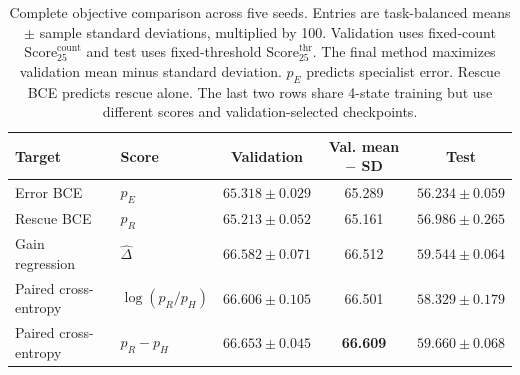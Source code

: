 \begin{table}[H]
\centering
\caption{Complete objective comparison across five seeds. Entries are task-balanced means $\pm$ sample standard deviations, multiplied by 100. Validation uses fixed-count $\mathrm{Score}_{25}^{\mathrm{count}}$ and test uses fixed-threshold $\mathrm{Score}_{25}^{\mathrm{thr}}$. The final method maximizes validation mean minus standard deviation. $p_E$ predicts specialist error. Rescue BCE predicts rescue alone. The last two rows share 4-state training but use different scores and validation-selected checkpoints.}
\label{tab:objective_full}
\small
\setlength{\tabcolsep}{6pt}
\begin{tabular}{@{}llccc@{}}
\toprule
Target & Score & Validation & Val. mean $-$ SD & Test \\
\midrule
Error BCE & $p_E$ & $65.318\pm0.029$ & 65.289 & $56.234\pm0.059$ \\
Rescue BCE & $p_R$ & $65.213\pm0.052$ & 65.161 & $56.986\pm0.265$ \\
Gain regression & $\widehat\Delta$ & $66.582\pm0.071$ & 66.512 & $59.544\pm0.064$ \\
Paired cross-entropy & $\log(p_R/p_H)$ & $66.606\pm0.105$ & 66.501 & $58.329\pm0.179$ \\
\rowcolor{learnfill}Paired cross-entropy & $p_R-p_H$ & $66.653\pm0.045$ & \textbf{66.609} & $59.660\pm0.068$ \\
\bottomrule
\end{tabular}
\end{table}
